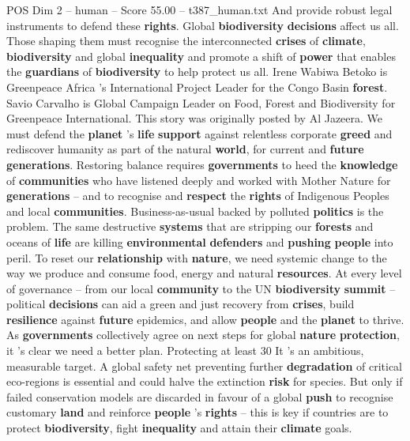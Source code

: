 \begin{textsample}{POS Dim 2 – human – Score 55.00 – t387\_human.txt}
And provide robust legal instruments to defend these \textbf{rights}.
Global \textbf{biodiversity} \textbf{decisions} affect us all.
Those shaping them must recognise the interconnected \textbf{crises} of \textbf{climate}, \textbf{biodiversity} and global \textbf{inequality} and promote a shift of \textbf{power} that enables the \textbf{guardians} of \textbf{biodiversity} to help protect us all.
Irene Wabiwa Betoko is Greenpeace Africa ’s International Project Leader for the Congo Basin \textbf{forest}.
Savio Carvalho is Global Campaign Leader on Food, Forest and Biodiversity for Greenpeace International.
This story was originally posted by Al Jazeera.
We must defend the \textbf{planet} ’s \textbf{life} \textbf{support} against relentless corporate \textbf{greed} and rediscover humanity as part of the natural \textbf{world}, for current and \textbf{future} \textbf{generations}.
Restoring balance requires \textbf{governments} to heed the \textbf{knowledge} of \textbf{communities} who have listened deeply and worked with Mother Nature for \textbf{generations} – and to recognise and \textbf{respect} the \textbf{rights} of Indigenous Peoples and local \textbf{communities}.
Business-as-usual backed by polluted \textbf{politics} is the problem.
The same destructive \textbf{systems} that are stripping our \textbf{forests} and oceans of \textbf{life} are killing \textbf{environmental} \textbf{defenders} and \textbf{pushing} \textbf{people} into peril.
To reset our \textbf{relationship} with \textbf{nature}, we need systemic change to the way we produce and consume food, energy and natural \textbf{resources}.
At every level of governance – from our local \textbf{community} to the UN \textbf{biodiversity} \textbf{summit} – political \textbf{decisions} can aid a green and just recovery from \textbf{crises}, build \textbf{resilience} against \textbf{future} epidemics, and allow \textbf{people} and the \textbf{planet} to thrive.
As \textbf{governments} collectively agree on next steps for global \textbf{nature} \textbf{protection}, it ’s clear we need a better plan.
Protecting at least 30 %
It ’s an ambitious, measurable target.
A global safety net preventing further \textbf{degradation} of critical eco-regions is essential and could halve the extinction \textbf{risk} for species.
But only if failed conservation models are discarded in favour of a global \textbf{push} to recognise customary \textbf{land} and reinforce \textbf{people} ’s \textbf{rights} – this is key if countries are to protect \textbf{biodiversity}, fight \textbf{inequality} and attain their \textbf{climate} goals.

\end{textsample}
